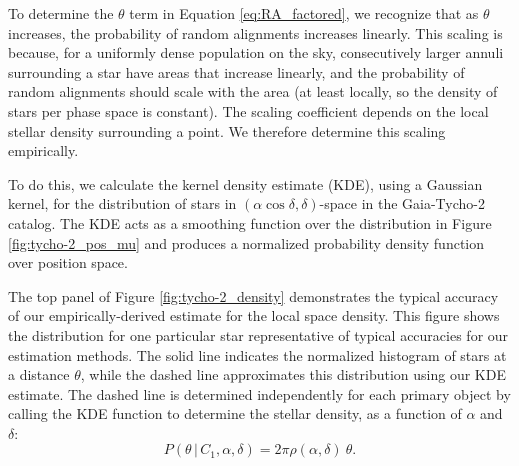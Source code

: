 \documentclass[usenatbib]{mnras}
\newcommand{\given}{\,|\,}
\begin{document}
To determine the $\theta$ term in Equation \ref{eq:RA_factored}, we recognize that as $\theta$ increases, the probability of random alignments increases linearly. This scaling is because, for a uniformly dense population on the sky, consecutively larger annuli surrounding a star have areas that increase linearly, and the probability of random alignments should scale with the area (at least locally, so the density of stars per phase space is constant). The scaling coefficient depends on the local stellar density surrounding a point. We therefore determine this scaling empirically. 

To do this, we calculate the kernel density estimate (KDE), using a Gaussian kernel, for the distribution of stars in $(\alpha \cos \delta, \delta)$-space in the Gaia-Tycho-2 catalog. The KDE acts as a smoothing function over the distribution in Figure \ref{fig:tycho-2_pos_mu} and produces a normalized probability density function over position space. 


The top panel of Figure \ref{fig:tycho-2_density} demonstrates the typical accuracy of our empirically-derived estimate for the local space density. This figure shows the distribution for one particular star representative of typical accuracies for our estimation methods. The solid line indicates the normalized histogram of stars at a distance $\theta$, while the dashed line approximates this distribution using our KDE estimate. The dashed line is determined independently for each primary object by calling the KDE function to determine the stellar density, as a function of $\alpha$ and $\delta$:
\begin{equation}
P(\theta \given C_1, \alpha, \delta) = 2 \pi \rho(\alpha, \delta)\ \theta. \label{eq:P_theta}
\end{equation}
\end{document}

